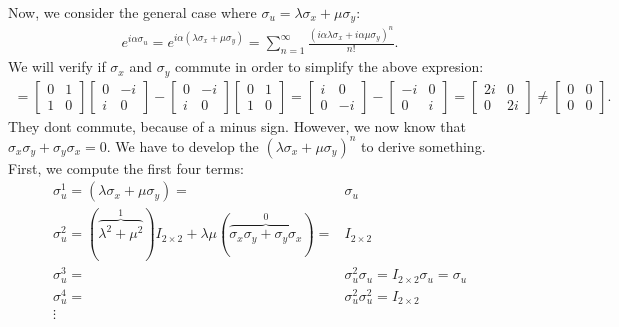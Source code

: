 \documentclass[letterpaper,11pt,twoside]{article}
\begin{document}
Now, we consider the general case where $\sigma_u=\lambda\sigma_x+\mu\sigma_y$:
\begin{align*}
  e^{i\alpha\sigma_u}=e^{i\alpha(\lambda\sigma_x+\mu\sigma_y)}=\sum_{n=1}^\infty\frac{(i\alpha\lambda\sigma_x+i\alpha\mu\sigma_y)^n}{n!}.
\end{align*}
We will verify if $\sigma_x$ and $\sigma_y$ commute in order to simplify the above expresion:
\begin{align*}
  [\sigma_x,\sigma_y]=\begin{bmatrix}
    0&1\\1&0
  \end{bmatrix}\begin{bmatrix}
    0&-i\\i&0
  \end{bmatrix}-\begin{bmatrix}
    0&-i\\i&0
  \end{bmatrix}\begin{bmatrix}
    0&1\\1&0
  \end{bmatrix}=\begin{bmatrix}
    i&0\\0&-i
  \end{bmatrix}-\begin{bmatrix}
    -i&0\\0&i
  \end{bmatrix}=\begin{bmatrix}
    2i&0\\0&2i
  \end{bmatrix}\neq\begin{bmatrix}
    0&0\\0&0
  \end{bmatrix}.
\end{align*}
They dont commute, because of a minus sign. However, we now know that $\sigma_x\sigma_y+\sigma_y\sigma_x=0$. We have to 
develop the $(\lambda\sigma_x+\mu\sigma_y)^n$ to derive something. First, we compute the first four terms:
{\small
\begin{align*}
    \sigma_u^1=(\lambda\sigma_x+\mu\sigma_y)=&\sigma_u\\
    \sigma_u^2=(\overbrace{\lambda^2+\mu^2}^{1})I_{2\times2}+\lambda\mu(\overbrace{\sigma_x\sigma_y+\sigma_y\sigma_x}^{0})=&I_{2\times2}\\
    \sigma_u^3=&\sigma_u^2\sigma_u=I_{2\times2}\sigma_u=\sigma_u\\
    \sigma_u^4=&\sigma_u^2\sigma_u^2=I_{2\times2}\\
    \vdots&
\end{align*}}
\end{document}
